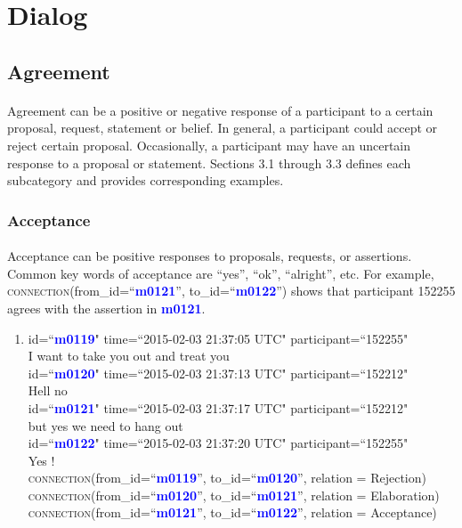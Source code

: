 \documentclass{article}
\begin{document}
\newpage
\section{Dialog}

\subsection{Agreement}
\paragraph{}
Agreement can be a positive or negative response of a participant to a certain proposal, request, statement or belief. In general, a participant could accept or reject certain proposal. Occasionally, a participant may have an uncertain response to a proposal or statement. Sections 3.1 through 3.3 defines each subcategory and provides corresponding examples. 

\subsubsection{Acceptance}
\paragraph{}
Acceptance can be positive responses to proposals, requests, or assertions. Common key words of acceptance are ``yes'', ``ok'', ``alright'', etc. For example, \textsc{connection}(from\_id=``\textbf{\textcolor{blue}{m0121}}'', to\_id=``\textbf{\textcolor{blue}{m0122}}'') shows that participant 152255 agrees with the assertion in \textbf{\textcolor{blue}{m0121}}.

\begin{enumerate}[resume]
\item id=``\textbf{\textcolor{blue}{m0119}}" time=``2015-02-03 21:37:05 UTC" participant=``152255"\\
I want to take you out and treat you\\
id=``\textbf{\textcolor{blue}{m0120}}" time=``2015-02-03 21:37:13 UTC" participant=``152212"\\
Hell no\\
id=``\textbf{\textcolor{blue}{m0121}}" time=``2015-02-03 21:37:17 UTC" participant=``152212"\\
but yes we need to hang out\\
id=``\textbf{\textcolor{blue}{m0122}}" time=``2015-02-03 21:37:20 UTC" participant=``152255"\\
Yes !\\
\textsc{connection}(from\_id=``\textbf{\textcolor{blue}{m0119}}'', to\_id=``\textbf{\textcolor{blue}{m0120}}'', relation = Rejection)\\
\textsc{connection}(from\_id=``\textbf{\textcolor{blue}{m0120}}'', to\_id=``\textbf{\textcolor{blue}{m0121}}'', relation = Elaboration)\\
\textsc{connection}(from\_id=``\textbf{\textcolor{blue}{m0121}}'', to\_id=``\textbf{\textcolor{blue}{m0122}}'', relation = Acceptance)
\end{enumerate}
\end{document}
